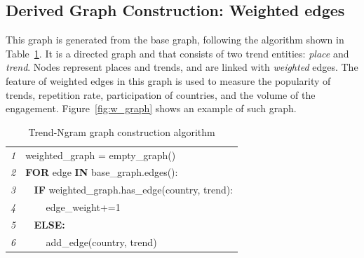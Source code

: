 \documentclass{comjnl}
\begin{document}
\subsection{Derived Graph Construction: Weighted edges}

This graph is generated from the base graph, following the algorithm shown in Table~\ref{tbl:algorithm1}. It is a directed graph and that consists of two trend entities: {\emph{place}} and {\emph{trend}}. Nodes represent places and trends, and are linked with {\emph{weighted}} edges. The feature of weighted edges in this graph is used to measure the popularity of trends, repetition rate, participation of countries, and the volume of the engagement. Figure~\ref{fig:w_graph} shows an example of such graph.


\begin{table}
\centering
\begin{tabular}{l|l}
\hline
{\emph{1}} & weighted\_graph = empty\_graph()\\
{\emph{2}} & \textbf{FOR} edge \textbf{IN} base\_graph.edges():\\
{\emph{3}} &  $\>\>\>\>$\textbf{IF} weighted\_graph.has\_edge(country, trend):\\
{\emph{4}} &  $\>\>\>\>\>\>\>\>$ edge\_weight+=1\\
{\emph{5}} &  $\>\>\>\>$\textbf{ELSE:}\\
{\emph{6}} &  $\>\>\>\>\>\>\>\>$ add\_edge(country, trend)\\
\hline
\end{tabular}
\caption{Trend-Ngram graph construction algorithm}
\label{tbl:algorithm1}
\end{table}


\end{document}
